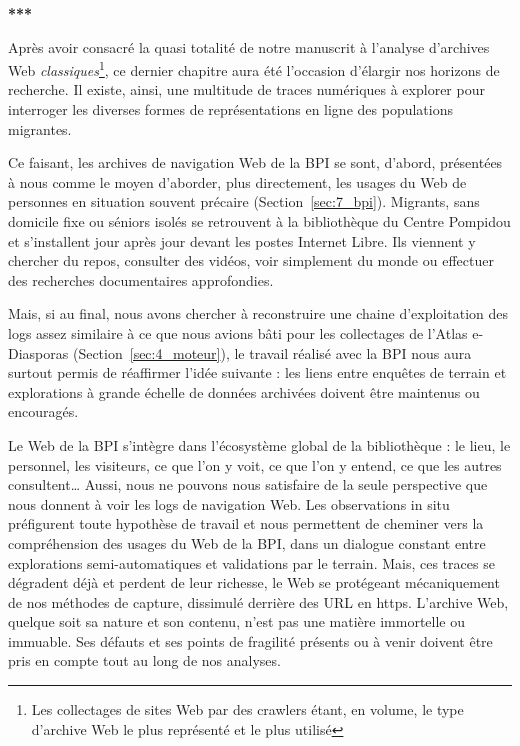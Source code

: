 \documentclass[symmetric,justified,marginals=raggedouter]{tufte-book}
\begin{document}
\begin{center}
	\textbf{***}
\end{center}

\noindent Après avoir consacré la quasi totalité de notre manuscrit à l'analyse d'archives Web \textit{classiques}\footnote{\RaggedOuter Les collectages de sites Web par des crawlers étant, en volume, le type d'archive Web le plus représenté et le plus utilisé}, ce dernier chapitre aura été l'occasion d'élar\-gir nos horizons de recherche. Il existe, ainsi, une multitude de traces numériques à explorer pour interroger les diverses formes de représentations en ligne des populations migrantes.  

Ce faisant, les archives de navigation Web de la BPI se sont, d'abord, présentées à nous comme le moyen d'aborder, plus directement, les usages du Web de personnes en situation souvent précaire (Section~\ref{sec:7_bpi}). Migrants, sans domicile fixe ou séniors isolés se retrouvent à la bibliothèque du Centre Pompidou et s'installent jour après jour devant les postes Internet Libre. Ils viennent y chercher du repos, consulter des vidéos, voir simplement du monde ou effectuer des recherches documentaires approfondies. 

Mais, si au final, nous avons chercher à reconstruire une chaine d'exploitation des logs assez similaire à ce que nous avions bâti pour les collectages de l'Atlas e-Diasporas (Section~\ref{sec:4_moteur}), le travail réalisé avec la BPI nous aura surtout permis de réaffirmer l'idée suivante : les liens entre enquêtes de terrain et explorations à grande échelle de données archivées doivent être maintenus ou encouragés. 

Le Web de la BPI s'intègre dans l'écosystème global de la bibliothèque : le lieu, le personnel, les visiteurs, ce que l'on y voit, ce que l'on y entend, ce que les autres consultent\ldots{} Aussi, nous ne pouvons nous satisfaire de la seule perspective que nous donnent à voir les logs de navigation Web. Les observations in situ préfigurent toute hypothèse de travail et nous permettent de cheminer vers la compréhension des usages du Web de la BPI, dans un dialogue constant entre explorations semi-automatiques et validations par le terrain. Mais, ces traces se dégradent déjà et perdent de leur richesse, le Web se protégeant mécaniquement de nos méthodes de capture, dissimulé derrière des URL en https. L'archive Web, quelque soit sa nature et son contenu, n'est pas une matière immortelle ou immuable. Ses défauts et ses points de fragilité présents ou à venir doivent être pris en compte tout au long de nos analyses.
\end{document}
